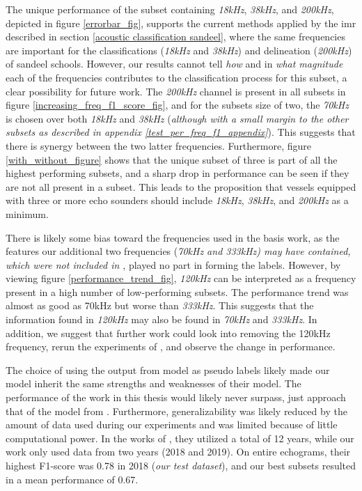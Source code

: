     The unique performance of the subset containing \textit{18kHz}, \textit{38kHz}, and \textit{200kHz}, depicted in figure \ref{errorbar_fig}, supports the current methods applied by the \gls{imr} described in section \ref{acoustic classification sandeel}, where the same frequencies are important for the classifications (\textit{18kHz} and \textit{38kHz}) and delineation (\textit{200kHz}) of sandeel schools. However, our results cannot tell \textit{how} and in \textit{what magnitude} each of the frequencies contributes to the classification process for this subset, a clear possibility for future work. The \textit{200kHz} channel is present in all subsets in figure \ref{increasing_freq_f1_score_fig}, and for the subsets size of two, the \textit{70kHz}  is chosen over both \textit{18kHz} and \textit{38kHz} (\textit{although with a small margin to the other subsets as described in appendix \ref{test_per_freq_f1_appendix}}). This suggests that there is synergy between the two latter frequencies. Furthermore, figure \ref{with_without_figure} shows that the unique subset of three is part of all the highest performing subsets, and a sharp drop in performance can be seen if they are not all present in a subset. This leads to the proposition that vessels equipped with three or more echo sounders should include \textit{18kHz}, \textit{38kHz}, and \textit{200kHz} as a minimum. 

    There is likely some bias toward the frequencies used in the basis work, as the features our additional two frequencies (\textit{70kHz and 333kHz) may have contained, which were not included in \citet{brautaset2020acoustic}}, played no part in forming the labels.  However, by viewing figure \ref{performance_trend_fig}, \textit{120kHz} can be interpreted as a frequency present in a high number of low-performing subsets. The performance trend was almost as good as 70kHz but worse than \textit{333kHz}. This suggests that the information found in \textit{120kHz} may also be found in \textit{70kHz} and \textit{333kHz}. In addition, we suggest that further work could look into removing the 120kHz frequency, rerun the experiments of \citet{brautaset2020acoustic}, and observe the change in performance. 
    
    The choice of using the output from \citeauthor{brautaset2020acoustic} model as pseudo labels likely made our model inherit the same strengths and weaknesses of their model. The performance of the work in this thesis would likely never surpass, just approach that of the model from \citeauthor{brautaset2020acoustic}. Furthermore, generalizability was likely reduced by the amount of data used during our experiments and was limited because of little computational power. In the works of \citeauthor{brautaset2020acoustic}, they utilized a total of 12 years, while our work only used data from two years (2018 and 2019). On entire echograms, their highest F1-score was 0.78 in 2018 (\textit{our test dataset}), and our best subsets resulted in a mean performance of 0.67.
    
